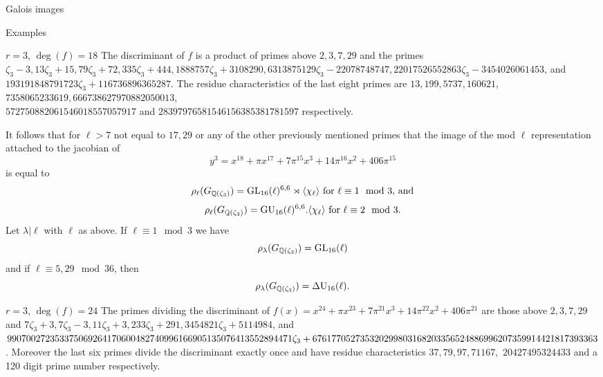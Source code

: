 \documentclass[11pt,a4paper]{article}
\newcommand{\Gcyclo}[1]{G_{\QQ(\zeta_{#1})}}
\begin{document}
\begin{section}{Galois images}
\begin{subsection}{Examples}
\begin{subsubsection}{$r=3$, $\deg(f) = 18$}
The discriminant of $f$ is a product of primes above $2,3,7,29$  and the primes $\zeta_3-3, 13\zeta_3 +
15, 79\zeta_3 + 72, 335\zeta_3 + 444, 1888757\zeta_3 + 3108290, 6313875129\zeta_3 - 22078748747, 22017526552863\zeta_3 - 3454026061453$, and $193191848791723\zeta_3 + 116736896365287$.
The residue characteristics of the last eight primes are $13, 199, 5737, 160621$, $ 7358065233619, 666738627970882050013$, \\ $572750882061546018557057917$ and $28397976581546156385381781597$ respectively.

It follows that for $\ell>7$ not equal to $17,29$ or any of the other previously mentioned primes that the image of the mod $\ell$ representation attached to the jacobian of
\[y^3 = x^{18} + \pi x^{17} + 7\pi^{15} x^3 + 14\pi ^{16} x^2 + 406\pi^{15}
\]
is equal to 
\[\rho_\ell(\Gcyclo{3}) = \GL_{16}(\ell)^{6,6} \rtimes \langle \chi_\ell \rangle \text{ for $\ell \equiv 1 \mod{3}$, and}
\]
\[\rho_\ell(\Gcyclo{3}) = \GU_{16}(\ell)^{6,6} . \langle \chi_\ell \rangle \text{ for $\ell \equiv 2 \mod{3}$.}
\]
Let $\lambda|\ell$ with $\ell$ as above. If $\ell \equiv 1 \mod{3}$ we have \[\rho_\lambda(\Gcyclo{3})=\GL_{16}(\ell)\]
and if $\ell \equiv 5,29 \mod{36}$, then
\[\rho_\lambda(\Gcyclo{3})=\DU_{16}(\ell).\]
\end{subsubsection}
\begin{subsubsection}{$r=3$, $\deg(f) = 24$}
The primes dividing the discriminant of $f(x) = x^{24} + \pi x^{23} + 7\pi^{21} x^3 + 14\pi ^{22} x^2 + 406\pi^{21}$ are those above $2,3,7,29$ and $7\zeta_3 + 3, 7\zeta_3 -
3, 11\zeta_3 + 3, 233\zeta_3 + 291, 3454821\zeta_3 + 5114984$, and \\ $990700272353375069264170600482740996166905135076413552894471\zeta_3 + \\
676177052735320299803168203356524886996207359914421817393363$.
Moreover the last six primes divide the discriminant exactly once and have residue characteristics $37, 79, 97, 71167,$ $20427495324433$ and a 120 digit prime number respectively.


\end{subsubsection}
\end{subsection}
\end{section}
\end{document}
